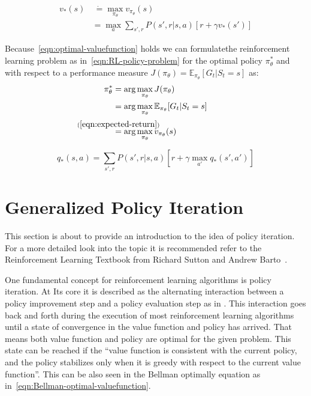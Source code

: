 \begin{align}
	v_*(s) & \ \dot{=} \max_{\pi_\theta} v_{\pi_\theta}(s) \label{eqn:optimal-valuefunction} \\
	&=\max_a \sum_{s', r} P(s', r| s, a)[r + \gamma v_*(s')] \label{eqn:Bellman-optimal-valuefunction}
\end{align}

Because~\eqref{eqn:optimal-valuefunction} holds we can formulatethe reinforcement learning problem as in~\eqref{eqn:RL-policy-problem} for the optimal policy $\pi_\theta^*$ and with respect to a performance measure $J(\pi_\theta) = \mathbb{E}_{\pi_\theta}[G_t | S_t = s]$ as:
\begin{align}
	\pi_\theta^* &= \arg \max_{\pi_\theta}J(\pi_\theta) \label{eqn:RL-policy-problem} \\
	&= \arg \max_{\pi_\theta} \mathbb{E}_{\pi_\theta}[G_t | S_t = s] \\
	&\overset{\mathclap{\strut(\ref{eqn:expected-return})}}{=} \arg \max_{\pi_\theta} v_{\pi_\theta}(s) \label{eqn:RL-policy-valuefunction}
\end{align}

\begin{equation}\label{eqn:Bellman-optimal-action-valuefunction}
	q_*(s, a) = \sum_{s', r} P(s', r|s, a)\left[r + \gamma \max_{a'} q_*(s', a')\right]
\end{equation}

\section{Generalized Policy Iteration}\label{sec:Generalized-Policy-Iteration}

This section is about to provide an introduction to the idea of policy iteration. For a more detailed look into the topic it is recommended refer to the Reinforcement Learning Textbook from Richard Sutton and Andrew Barto~\cite{SuttonBartoRLBook}.

One fundamental concept for reinforcement learning algorithms is policy iteration. At Its core it is described as the alternating interaction between a policy improvement step and a policy evaluation step as in . This interaction goes back and forth during the execution of most reinforcement learning algorithms until a state of convergence in the value function and policy has arrived. That means both value function and policy are optimal for the given problem. This state can be reached if the ``value function is consistent with the current policy, and the policy stabilizes only when it is greedy with respect to the current value function''. This can be also seen in the Bellman optimally equation as in~\eqref{eqn:Bellman-optimal-valuefunction}. 


